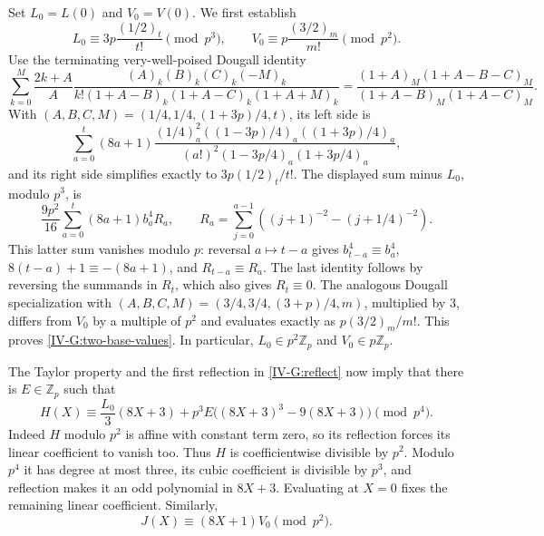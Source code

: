 \documentclass[11pt,letterpaper]{article}
\numberwithin{equation}{section}
\begin{document}
Set $L_0=L(0)$ and $V_0=V(0)$. We first establish
\begin{equation}\label{IV-G:two-base-values}
L_0\equiv3p\frac{(1/2)_t}{t!}\pmod{p^3},\qquad
V_0\equiv p\frac{(3/2)_m}{m!}\pmod{p^2}.
\end{equation}
Use the terminating very-well-poised Dougall identity
\[
\sum_{k=0}^{M}\frac{2k+A}{A}
\frac{(A)_k(B)_k(C)_k(-M)_k}
{k!(1+A-B)_k(1+A-C)_k(1+A+M)_k}
=\frac{(1+A)_M(1+A-B-C)_M}
{(1+A-B)_M(1+A-C)_M}.
\]
With $(A,B,C,M)=(1/4,1/4,(1+3p)/4,t)$, its left side is
\[
\sum_{a=0}^{t}(8a+1)
\frac{(1/4)_a^2((1-3p)/4)_a((1+3p)/4)_a}
{(a!)^2(1-3p/4)_a(1+3p/4)_a},
\]
and its right side simplifies exactly to $3p(1/2)_t/t!$.
The displayed sum minus $L_0$, modulo $p^3$, is
\[
\frac{9p^2}{16}\sum_{a=0}^{t}(8a+1)b_a^4 R_a,\qquad
R_a=\sum_{j=0}^{a-1}\left((j+1)^{-2}-(j+1/4)^{-2}\right).
\]
This latter sum vanishes modulo $p$: reversal $a\mapsto t-a$ gives
$b_{t-a}^4\equiv b_a^4$, $8(t-a)+1\equiv-(8a+1)$,
and $R_{t-a}\equiv R_a$. The last identity follows by reversing the
summands in $R_t$, which also gives $R_t\equiv0$. The analogous
Dougall specialization with
$(A,B,C,M)=(3/4,3/4,(3+p)/4,m)$, multiplied by $3$, differs
from $V_0$ by a multiple of $p^2$ and evaluates exactly as
$p(3/2)_m/m!$.
This proves \eqref{IV-G:two-base-values}. In particular,
$L_0\in p^2\mathbb Z_p$ and $V_0\in p\mathbb Z_p$.

The Taylor property and the first reflection in \eqref{IV-G:reflect}
now imply that there is $E\in\mathbb Z_p$ such that
\begin{equation}\label{IV-G:H-cubic}
H(X)\equiv\frac{L_0}{3}(8X+3)
 +p^3E\big((8X+3)^3-9(8X+3)\big)\pmod{p^4}.
\end{equation}
Indeed $H$ modulo $p^2$ is affine with constant term zero, so its
reflection forces its linear coefficient to vanish too. Thus $H$ is
coefficientwise divisible by $p^2$. Modulo $p^4$ it has degree at most
three, its cubic coefficient is divisible by $p^3$, and reflection
makes it an odd polynomial in $8X+3$. Evaluating at $X=0$ fixes the
remaining linear coefficient. Similarly,
\begin{equation}\label{IV-G:J-linear}
J(X)\equiv(8X+1)V_0\pmod{p^2}.
\end{equation}
\end{document}
